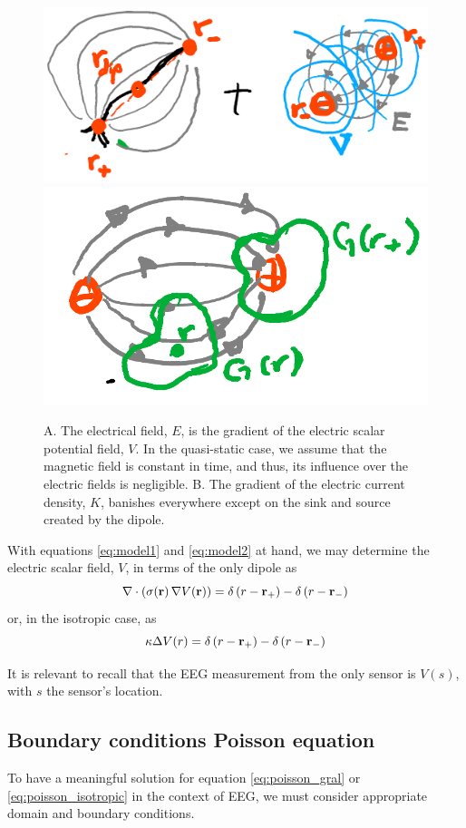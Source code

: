 \begin{figure}
\centering
\includegraphics[width=0.4\linewidth]{./img_dev/nsNeuronDipole}
\includegraphics[width=0.4\linewidth]{./img_dev/nsCurrDensField}
\caption{A. The electrical field, $E$, is the gradient of the electric scalar potential field, $V$. In the quasi-static case, we assume that the magnetic field is constant in time, and thus, its influence over the electric fields is negligible. B. The gradient of the electric current density, $K$, banishes everywhere except on the sink and source created by the dipole. }
\label{fig:diagrams1}
\end{figure}

With equations \eqref{eq:model1} and \eqref{eq:model2} at hand, we may determine the electric scalar field, $V$, in terms of the only dipole as
\begin{equation}
\nabla \cdot\left( \sigma(\mathbf{r})\, \nabla V(\mathbf{r})  \right) = 
{\delta\left( r-\mathbf{r}_+ \right) - \delta\left( r-\mathbf{r}_- \right)}
\label{eq:poisson_gral}
\end{equation}
or, in the isotropic case, as
\begin{equation}
\kappa \Delta V(r) = 
{\delta\left( r-\mathbf{r}_+ \right) - \delta\left( r-\mathbf{r}_- \right)}
\label{eq:poisson_isotropic}
\end{equation}

It is relevant to recall that the EEG measurement from the only sensor is $V(s)$, with $s$ the sensor's location.


\subsection{Boundary conditions Poisson equation}

To have a meaningful solution for equation \eqref{eq:poisson_gral} or \eqref{eq:poisson_isotropic} in the context of EEG, we must consider appropriate domain and boundary conditions.

